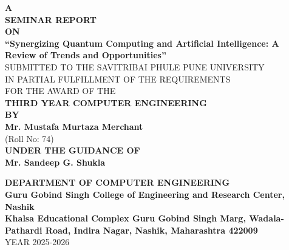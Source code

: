 	\begin{titlepage}   
		\thisfancypage{\setlength{\fboxsep}{10pt}\doublebox}{}
		\vspace{0.1in}
		\begin{center}
		{ \bf {A}}\\
		\vspace{0.1in}
		{ \bf {SEMINAR REPORT}}\\
		\vspace{0.1in}
		{ \bf {ON}}\\
		\vspace{0.2in}
		{\Large \bf {``Synergizing Quantum Computing and Artificial Intelligence: A Review of Trends and Opportunities''}}
		\\
		\vspace{0.2in}
		{ SUBMITTED TO THE SAVITRIBAI PHULE PUNE UNIVERSITY}\\
		{ IN PARTIAL FULFILLMENT OF THE REQUIREMENTS}\\
		{ FOR THE AWARD OF THE}\\
		\vspace{0.2in}
		{\bf THIRD YEAR COMPUTER ENGINEERING }\\	
		\vspace{0.1in}
		{\bf BY}\\
		\vspace{0.1in}
		{\bf Mr. Mustafa Murtaza Merchant } \hspace{0.1in}\\ {\small{ (Roll No:  74) }}\\
		
		\vspace{0.2in}
		{\bf UNDER THE GUIDANCE OF}\\
		\vspace{0.1in}
		{\large \bf Mr. Sandeep G. Shukla}\\
		\vspace{0.17in}
		\begin{figure*}[h]
		\centerline{}
		\label{atcres}
		\end{figure*}
		\vspace{0.17in}
		{\large \bf{ DEPARTMENT OF COMPUTER ENGINEERING}}\\ 
		{ \large \bf {Guru Gobind Singh College of Engineering and Research Center, Nashik}}\\ 
		{\bf Khalsa Educational Complex Guru Gobind Singh Marg, Wadala-Pathardi Road, Indira Nagar, Nashik, Maharashtra 422009}\\ 
		\small{YEAR 2025-2026}
		\end{center}
	\end{titlepage}